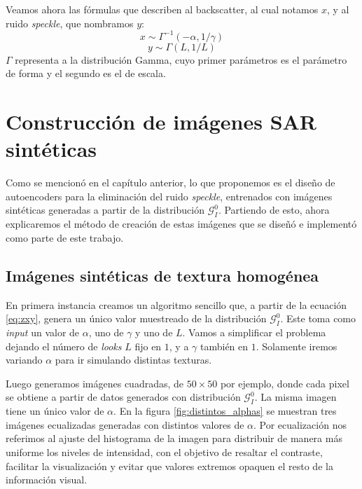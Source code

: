 Veamos ahora las fórmulas que describen al backscatter, al cual notamos $x$, y al ruido \emph{speckle}, que nombramos $y$:
\begin{equation}\label{eq:backsacatter}
    x \sim \Gamma^{-1}(-\alpha, 1/\gamma)
\end{equation}
\begin{equation}\label{eq:ruido_speckle}
    y \sim \Gamma(L, 1/L)
\end{equation}
$\Gamma$ representa a la distribución Gamma, cuyo primer parámetros es el parámetro de forma y el segundo es el de escala.

\section{Construcción de imágenes SAR sintéticas}\label{sec:construccion_imagenes_SAR}

Como se mencionó en el capítulo anterior, lo que proponemos es el diseño de autoencoders para la eliminación del ruido \emph{speckle}, entrenados con imágenes sintéticas generadas a partir de la distribución \( \mathcal{G}_I^0 \). Partiendo de esto, ahora explicaremos el método de creación de estas imágenes que se diseñó e implementó como parte de este trabajo.

\subsection{Imágenes sintéticas de textura homogénea}\label{subsec:imagenes_homogeneas}

En primera instancia creamos un algoritmo sencillo que, a partir de la ecuación \ref{eq:zxy}, genera un único valor muestreado de la distribución \( \mathcal{G}_I^0 \). Este toma como \emph{input} un valor de $\alpha$, uno de $\gamma$ y uno de $L$. Vamos a simplificar el problema dejando el número de \emph{looks} $L$ fijo en $1$, y a $\gamma$ también en $1$. Solamente iremos variando $\alpha$ para ir simulando distintas texturas.

Luego generamos imágenes cuadradas, de $50\times 50$ por ejemplo, donde cada pixel se obtiene a partir de datos generados con distribución \( \mathcal{G}_I^0 \). La misma imagen tiene un único valor de $\alpha$. En la figura \ref{fig:distintos_alphas} se muestran tres imágenes ecualizadas generadas con distintos valores de $\alpha$. Por ecualización nos referimos al ajuste del histograma de la imagen para distribuir de manera más uniforme los niveles de intensidad, con el objetivo de resaltar el contraste, facilitar la visualización y evitar que valores extremos opaquen el resto de la información visual.

